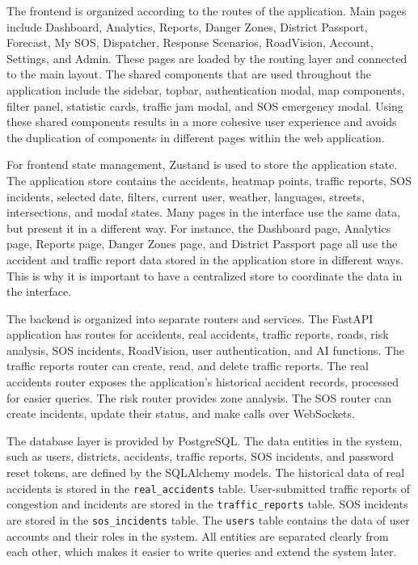 ﻿\documentclass[12pt,a4paper]{report}
\begin{document}
The frontend is organized according to the routes of the application. Main pages include Dashboard, Analytics, Reports, Danger Zones, District Passport, Forecast, My SOS, Dispatcher, Response Scenarios, RoadVision, Account, Settings, and Admin. These pages are loaded by the routing layer and connected to the main layout. The shared components that are used throughout the application include the sidebar, topbar, authentication modal, map components, filter panel, statistic cards, traffic jam modal, and SOS emergency modal. Using these shared components results in a more cohesive user experience and avoids the duplication of components in different pages within the web application.

For frontend state management, Zustand is used to store the application state. The application store contains the accidents, heatmap points, traffic reports, SOS incidents, selected date, filters, current user, weather, languages, streets, intersections, and modal states. Many pages in the interface use the same data, but present it in a different way. For instance, the Dashboard page, Analytics page, Reports page, Danger Zones page, and District Passport page all use the accident and traffic report data stored in the application store in different ways. This is why it is important to have a centralized store to coordinate the data in the interface.

The backend is organized into separate routers and services. The FastAPI application has routes for accidents, real accidents, traffic reports, roads, risk analysis, SOS incidents, RoadVision, user authentication, and AI functions. The traffic reports router can create, read, and delete traffic reports. The real accidents router exposes the application's historical accident records, processed for easier queries. The risk router provides zone analysis. The SOS router can create incidents, update their status, and make calls over WebSockets.

The database layer is provided by PostgreSQL. The data entities in the system, such as users, districts, accidents, traffic reports, SOS incidents, and password reset tokens, are defined by the SQLAlchemy models. The historical data of real accidents is stored in the \texttt{real\_accidents} table. User-submitted traffic reports of congestion and incidents are stored in the \texttt{traffic\_reports} table. SOS incidents are stored in the \texttt{sos\_incidents} table. The \texttt{users} table contains the data of user accounts and their roles in the system. All entities are separated clearly from each other, which makes it easier to write queries and extend the system later.
\end{document}
